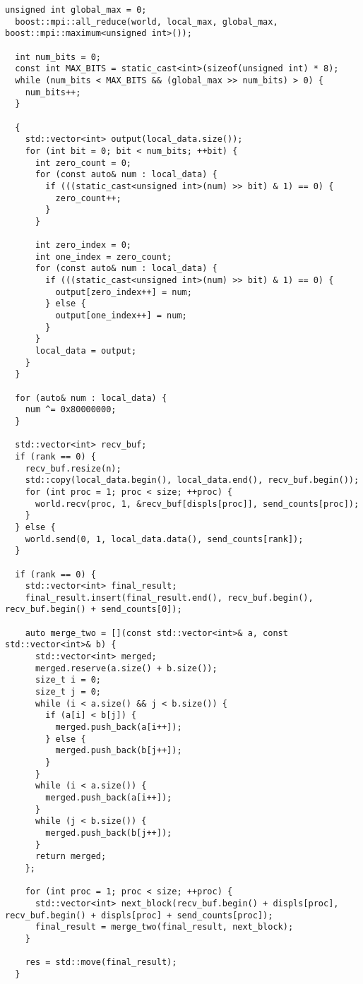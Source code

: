 \documentclass[12pt]{article}
\begin{document}
\begin{lstlisting}[caption={Параллельная версия поразрядной сортировки с использованием MPI}]
  unsigned int global_max = 0;
  boost::mpi::all_reduce(world, local_max, global_max, boost::mpi::maximum<unsigned int>());

  int num_bits = 0;
  const int MAX_BITS = static_cast<int>(sizeof(unsigned int) * 8);
  while (num_bits < MAX_BITS && (global_max >> num_bits) > 0) {
    num_bits++;
  }

  {
    std::vector<int> output(local_data.size());
    for (int bit = 0; bit < num_bits; ++bit) {
      int zero_count = 0;
      for (const auto& num : local_data) {
        if (((static_cast<unsigned int>(num) >> bit) & 1) == 0) {
          zero_count++;
        }
      }

      int zero_index = 0;
      int one_index = zero_count;
      for (const auto& num : local_data) {
        if (((static_cast<unsigned int>(num) >> bit) & 1) == 0) {
          output[zero_index++] = num;
        } else {
          output[one_index++] = num;
        }
      }
      local_data = output;
    }
  }

  for (auto& num : local_data) {
    num ^= 0x80000000;
  }

  std::vector<int> recv_buf;
  if (rank == 0) {
    recv_buf.resize(n);
    std::copy(local_data.begin(), local_data.end(), recv_buf.begin());
    for (int proc = 1; proc < size; ++proc) {
      world.recv(proc, 1, &recv_buf[displs[proc]], send_counts[proc]);
    }
  } else {
    world.send(0, 1, local_data.data(), send_counts[rank]);
  }

  if (rank == 0) {
    std::vector<int> final_result;
    final_result.insert(final_result.end(), recv_buf.begin(), recv_buf.begin() + send_counts[0]);

    auto merge_two = [](const std::vector<int>& a, const std::vector<int>& b) {
      std::vector<int> merged;
      merged.reserve(a.size() + b.size());
      size_t i = 0;
      size_t j = 0;
      while (i < a.size() && j < b.size()) {
        if (a[i] < b[j]) {
          merged.push_back(a[i++]);
        } else {
          merged.push_back(b[j++]);
        }
      }
      while (i < a.size()) {
        merged.push_back(a[i++]);
      }
      while (j < b.size()) {
        merged.push_back(b[j++]);
      }
      return merged;
    };

    for (int proc = 1; proc < size; ++proc) {
      std::vector<int> next_block(recv_buf.begin() + displs[proc], recv_buf.begin() + displs[proc] + send_counts[proc]);
      final_result = merge_two(final_result, next_block);
    }

    res = std::move(final_result);
  }


\end{lstlisting}
\end{document}
